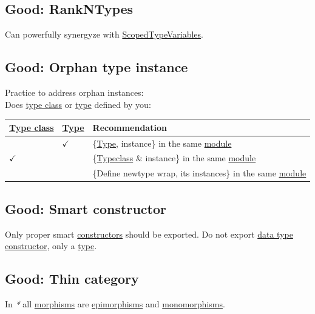 \documentclass[11pt]{article}
\begin{document}
\subsection{\label{org5954c4a}Good: RankNTypes}
\label{sec:org2ba7627}
Can powerfully synergyze with \hyperref[org98e1643]{ScopedTypeVariables}.\\

\subsection{\label{org374bf9e}Good: Orphan type instance}
\label{sec:org5c5211f}
Practice to address orphan instances:\\

Does \hyperref[org16d8a26]{type class} or \hyperref[orgc4aea2f]{type} defined by you:\\
\begin{center}
\begin{tabular}{lll}
\hyperref[org16d8a26]{Type class} & \hyperref[orgc4aea2f]{Type} & Recommendation\\
\hline
 & \(\checkmark\) & \{\hyperref[orgc4aea2f]{Type}, instance\} in the same \hyperref[org5699463]{module}\\
\(\checkmark\) &  & \{\hyperref[org4b94384]{Typeclass} \& instance\} in the same \hyperref[org5699463]{module}\\
 &  & \{Define newtype wrap, its instances\} in the same \hyperref[org5699463]{module}\\
\end{tabular}
\end{center}

\subsection{\label{org40576bb}Good: Smart constructor}
\label{sec:org18abef2}
Only proper smart \hyperref[org7a9d75a]{constructors} should be exported. Do not export \hyperref[org212d9c3]{data type} \hyperref[orgf4d811d]{constructor}, only a \hyperref[orgc4aea2f]{type}.\\

\subsection{\label{orgaa2d5d6}Good: Thin category}
\label{sec:org427f6ff}
In \emph{*} all \hyperref[org6c2fa5c]{morphisms} are \hyperref[orgd8e0403]{epimorphisms} and \hyperref[orgb4eb8ed]{monomorphisms}.\\
\end{document}
